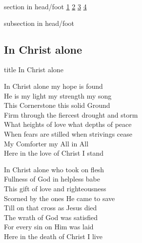 \documentclass{beamer}
\begin{document}
{
{ 
 {
 \begin{beamercolorbox}[ht=4.5ex,dp=1.5ex,%
      leftskip=.3cm,rightskip=.3cm plus1fil]{section in head/foot}
 \fontsize{12}{25}\selectfont 
\hyperlink{In Christ alone[]1}{1}
\hyperlink{In Christ alone[]2}{2}
\hyperlink{In Christ alone[]3}{3}
\hyperlink{In Christ alone[]4}{4}
 
 \end{beamercolorbox}%
  \begin{beamercolorbox}[ht=2.5ex,dp=1.125ex,%
   leftskip=.3cm,rightskip=.3cm plus1fil]{subsection in head/foot}
   \insertauthor
 \end{beamercolorbox}%
 }
}
\subsection{ In Christ alone }

\hypertarget{In Christ alone[]}{}
\begin{frame}{}
 \vfill
  \centering
  \begin{beamercolorbox}[sep=8pt,center,shadow=true,rounded=true]{title}
    In Christ alone     
  \end{beamercolorbox}
  \vfill
\end{frame}

\hypertarget{In Christ alone[]1}{}
\begin{frame}{}
\fontsize{ 18 }{ 23 }\selectfont

In Christ alone my hope is found\\ 
He is my light my strength my song\\ 
This Cornerstone this solid Ground\\ 
Firm through the fiercest drought and storm\\ 
What heights of love what depths of peace\\ 
When fears are stilled when strivings cease\\ 
My Comforter my All in All\\ 
Here in the love of Christ I stand 

\end{frame}

\hypertarget{In Christ alone[]2}{}
\begin{frame}{}
\fontsize{ 18 }{ 23 }\selectfont

In Christ alone who took on flesh\\ 
Fullness of God in helpless babe\\ 
This gift of love and righteousness\\ 
Scorned by the ones He came to save\\ 
Till on that cross as Jesus died\\ 
The wrath of God was satisfied\\ 
For every sin on Him was laid\\ 
Here in the death of Christ I live 


\end{frame}}
\end{document}
